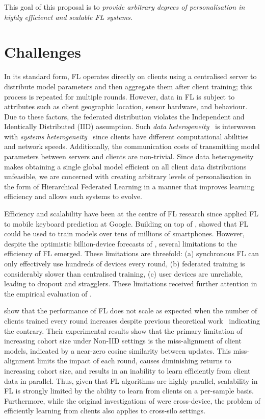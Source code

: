 This goal of this proposal is to \emph{provide arbitrary degrees of personalisation in highly efficienct and scalable FL systems.}

\section{Challenges}
In its standard form, FL operates directly on clients using a centralised server to distribute model parameters and then aggregate them after client training; this process is repeated for multiple rounds. However, data in FL is subject to attributes such as client geographic location, sensor hardware, and behaviour. Due to these factors, the federated distribution violates the Independent and Identically Distributed (IID) assumption. Such \emph{data heterogeneity}~\citep[sec. 3.1]{AdvancedAndOpenProblems} is interwoven with \emph{systems heterogeneity}~\citep[sec. 7.2]{AdvancedAndOpenProblems} since clients have different computational abilities and network speeds. Additionally, the communication costs of transmitting model parameters between servers and clients are non-trivial. Since data heterogeneity makes obtaining a single global model efficient on all client data distributions unfeasible, we are concerned with creating arbitrary levels of personalisation in the form of Hierarchical Federated Learning in a manner that improves learning efficiency and allows such systems to evolve.


Efficiency and scalability have been at the centre of FL research since \citet{GoogleKeyboard} applied FL to mobile keyboard prediction at Google. Building on top of \citet{GoogleKeyboard}, \citet{ScaleSystemDesign} showed that FL could be used to train models over tens of millions of smartphones. However, despite the optimistic billion-device forecasts of \citet{ScaleSystemDesign}, several limitations to the efficiency of FL emerged. These limitations are threefold: (a) synchronous FL can only effectively use hundreds of devices every round, (b) federated training is considerably slower than centralised training, (c) user devices are unreliable, leading to dropout and stragglers. These limitations received further attention in the empirical evaluation of \citet{LargeCohorts}.

\citet{LargeCohorts} show that the performance of FL does not scale as expected when the number of clients trained every round increases despite previous theoretical work~\citep{TighterTheory} indicating the contrary. Their experimental results show that the primary limitation of increasing cohort size under Non-IID settings is the miss-alignment of client models, indicated by a near-zero cosine similarity between updates. This miss-alignment limits the impact of each round, causes diminishing returns to increasing cohort size, and results in an inability to learn efficiently from client data in parallel. Thus, given that FL algorithms are highly parallel, scalability in FL is strongly limited by the ability to learn from clients on a per-sample basis. Furthermore, while the original investigations of \citet{ScaleSystemDesign,LargeCohorts} were cross-device, the problem of efficiently learning from clients also applies to cross-silo settings.

